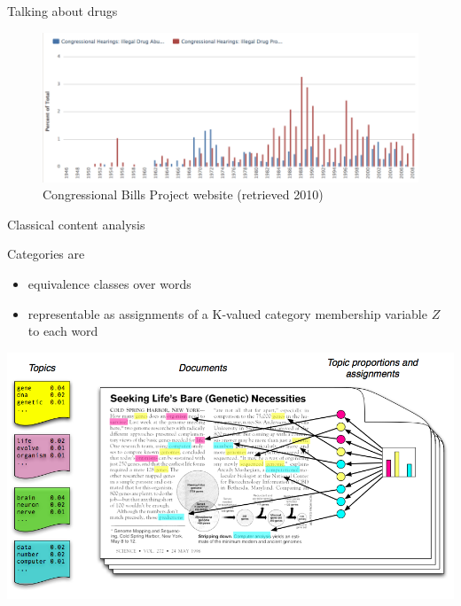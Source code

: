 \documentclass{hertieteaching}
\begin{document}
\begin{frame}{Talking about drugs}


\begin{figure}

{\centering \includegraphics[width=0.9\linewidth]{pictures/drugs} 

}

\caption{Congressional Bills Project website (retrieved 2010)}\label{fig:unnamed-chunk-6}
\end{figure}

\end{frame}

\begin{frame}{Classical content analysis}
\protect\hypertarget{classical-content-analysis-1}{}

Categories are

\begin{itemize}
\item
  equivalence classes over words\item
  representable as assignments of a K-valued category membership
  variable \(Z\) to each word
\end{itemize}

\begin{center}\includegraphics[width=0.6\linewidth]{pictures/topics2} \end{center}

\end{frame}
\end{document}
